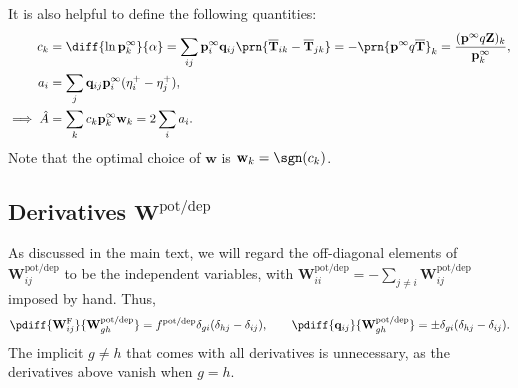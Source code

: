 \documentclass{article} %
\newcommand{\pr}{\mathbf{p}}
\newcommand{\eq}{\pr^\infty}
\newcommand{\fpt}{\mathbf{T}}
\newcommand{\fptb}{\overline{\fpt}}
\newcommand{\fund}{\mathbf{Z}}
\newcommand{\w}{\mathbf{w}}
\newcommand{\W}{\mathbf{W}}
\newcommand{\enc}{\mathbf{q}}
\newcommand{\frg}{\W^{\mathrm{F}}}
\newcommand{\potdep}{^{\text{pot/dep}}}
\begin{document}
It is also helpful to define the following quantities:
%
\begin{equation}\label{eq:areacoeffs}
  \begin{aligned}
    c_k &= \diff{\ln\eq_k}{\alpha}
      = \sum_{ij} \eq_i \enc_{ij} \prn{\fptb_{ik}-\fptb_{jk}}
      = - \prn{\eq q \fptb}_k
      = \frac{(\eq q \fund)_k}{\eq_k}, \\
    a_i &= \sum_j \enc_{ij} \eq_i (\eta^+_{i} - \eta^+_{j}),\\
    \implies
    \hat{A} &= \sum_k c_k \eq_k \w_k
      = 2\sum_i a_i.
  \end{aligned}
\end{equation}
%
Note that the optimal choice of $\w$ is $\w_k = \sgn(c_k)$.

\subsection{Derivatives \wrt \texorpdfstring{$\W\potdep $}{W(pot/dep)}}\label{sec:deriv}

As discussed in the main text,
we will regard the off-diagonal elements of $\W\potdep _{ij}$ to be the independent variables,
with $\W\potdep _{ii}=-\sum_{j \neq i} \W\potdep _{ij}$ imposed by hand.
Thus,
%
\begin{equation}\label{eq:basicderivs}
  \pdiff{\frg_{ij}}{\W\potdep _{gh}} = f\potdep  \delta_{gi}(\delta_{hj}-\delta_{ij}),
  \qquad
  \pdiff{\enc_{ij}}{\W\potdep _{gh}} = \pm\delta_{gi}(\delta_{hj}-\delta_{ij}).
\end{equation}
%
The implicit $g \neq h$ that comes with all derivatives is unnecessary, as the derivatives above vanish when $g=h$.
\end{document}

